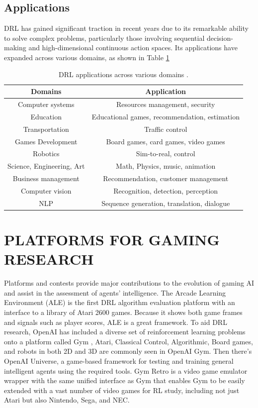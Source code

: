 \documentclass{article}
\begin{document}
\subsection{Applications}
DRL has gained significant traction in recent years due to its remarkable ability to solve complex problems, particularly those involving sequential decision-making and high-dimensional continuous action spaces. Its applications have expanded across various domains, as shown in Table \ref{tab: DRL applications across various domains.} 


\begin{table}
    \centering
    \begin{tabularx}{\textwidth}{|c|c|} \hline
        \textbf{Domains}& \textbf{Application}\\ \hline 
             Computer systems& Resources management, security\\ \hline 
             Education& Educational games, recommendation, estimation\\ \hline 
             Transportation&Traffic control\\ \hline 
             Games Development& Board games, card games, video games\\ \hline 
             Robotics& Sim-to-real, control\\ \hline 
             Science, Engineering, Art& Math, Physics, music, animation\\ \hline 
             Business management& Recommendation, customer management\\ \hline 
             Computer vision& Recognition, detection, perception\\ \hline 
             NLP& Sequence generation, translation, dialogue\\\hline
    \end{tabularx}
    \caption{DRL applications across various domains \cite{li2017deep}.}
    \label{tab: DRL applications across various domains.}
\end{table}

\section{PLATFORMS FOR GAMING RESEARCH}
Platforms and contests provide major contributions to the
evolution of gaming AI and assist in the assessment of agents'
intelligence. The Arcade Learning Environment (ALE) is the
first DRL algorithm evaluation platform with an interface to a
library of Atari 2600 games. Because it shows both game
frames and signals such as player scores, ALE is a great
framework. To aid DRL research, OpenAI has included a
diverse set of reinforcement learning problems onto a platform
called Gym \cite{brockman2016openai}, Atari, Classical Control, Algorithmic, Board
games, and robots in both 2D and 3D are commonly seen in
OpenAI Gym. Then there's OpenAI Universe, a game-based
framework for testing and training general intelligent agents
using the required tools. Gym Retro is a video game emulator
wrapper with the same unified interface as Gym that enables
Gym to be easily extended with a vast number of video games
for RL study, including not just Atari but also Nintendo, Sega,
and NEC.
\end{document}
